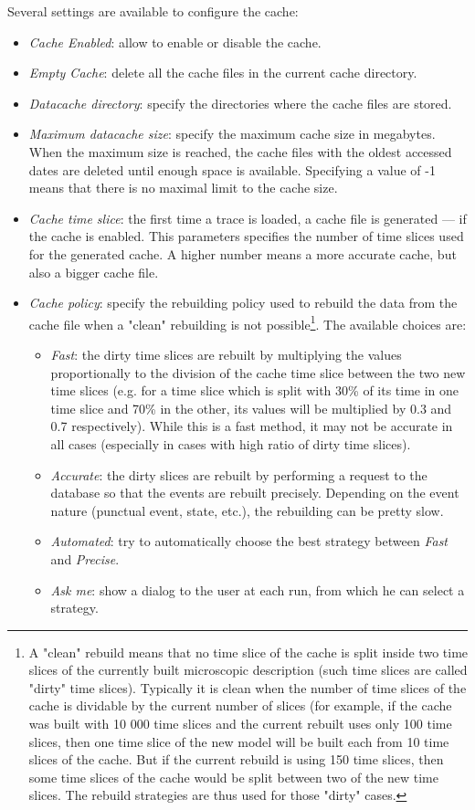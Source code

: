 \documentclass[twoside]{article}
\begin{document}
\begin{sloppypar}
Several settings are available to configure the cache:
\begin{itemize}
	\item \textit{Cache Enabled}: allow to enable or disable the cache.
	\item \textit{Empty Cache}: delete all the cache files in the current cache directory.
	\item \textit{Datacache directory}: specify the directories where the cache files are stored.
	\item \textit{Maximum datacache size}: specify the maximum cache size in megabytes. When the maximum size is reached, the cache files with the oldest accessed dates are deleted until enough space is available. Specifying a value of -1 means that there is no maximal limit to the cache size.
	\item \textit{Cache time slice}: the first time a trace is loaded, a cache file is generated --- if the cache is enabled. This parameters specifies the number of time slices used for the generated cache. A higher number means a more accurate cache, but also a bigger cache file.
	\item \textit{Cache policy}: specify the rebuilding policy used to rebuild the data from the cache file when a "clean" rebuilding is not possible\footnote{A "clean" rebuild means that no time slice of the cache is split inside two time slices of the currently built microscopic description (such time slices are called "dirty" time slices). Typically it is clean when the number of time slices of the cache is dividable by the current number of slices (for example, if the cache was built with 10 000 time slices and the current rebuilt uses only 100 time slices, then one time slice of the new model will be built each from 10 time slices of the cache. But if the current rebuild is using 150 time slices, then some time slices of the cache would be split between two of the new time slices. The rebuild strategies are thus used for those "dirty" cases.}. The available choices are:
	\begin{itemize}
		\item \textit{Fast}: the dirty time slices are rebuilt by multiplying the values proportionally to the division of the cache time slice between the two new time slices (e.g. for a time slice which is split with 30\% of its time in one time slice and 70\% in the other, its values will be multiplied by 0.3 and 0.7 respectively). While this is a fast method, it may not be accurate in all cases (especially in cases with high ratio of dirty time slices).
		\item \textit{Accurate}: the dirty slices are rebuilt by performing a request to the database so that the events are rebuilt precisely. Depending on the event nature (punctual event, state, etc.), the rebuilding can be pretty slow.
		\item \textit{Automated}: try to automatically choose the best strategy between \textit{Fast} and \textit{Precise}. 
		\item \textit{Ask me}: show a dialog to the user at each run, from which he can select a strategy.
	\end{itemize}   
\end{itemize} 


\end{sloppypar}
\end{document}
